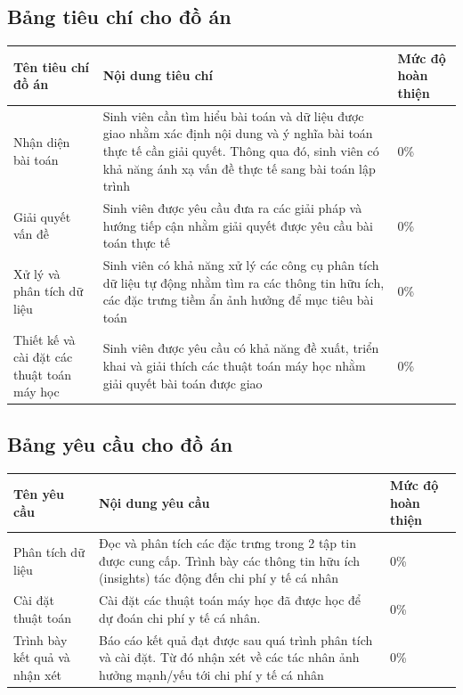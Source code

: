 \documentclass{article}
\newcommand\T{\rule{0pt}{2.6ex}}       %
\newcommand\B{\rule[-1.2ex]{0pt}{0pt}} %
\begin{document}
	\subsection{Bảng tiêu chí cho đồ án}
	\begin{center}
		\begin{tabular}{ | p{5cm} | p{6cm} | l |}\hline
			Tên tiêu chí đồ án & Nội dung tiêu chí & Mức độ hoàn thiện  \T\B\\\hline
			Nhận diện bài toán & Sinh viên cần tìm hiểu bài toán và dữ liệu được giao
			nhằm xác định nội dung và ý nghĩa bài toán thực tế cần giải quyết. Thông
			qua đó, sinh viên có khả năng ánh xạ vấn đề thực tế sang bài toán lập trình & 0\%  \T\B\\\hline
			Giải quyết vấn đề & Sinh viên được yêu cầu đưa ra các giải pháp và hướng
			tiếp cận nhằm giải quyết được yêu cầu bài toán thực tế & 0\%  \T\B\\\hline
			Xử lý và phân tích dữ liệu & Sinh viên có khả năng xử lý các công cụ phân
			tích dữ liệu tự động nhằm tìm ra các thông tin hữu ích, các đặc trưng tiềm ẩn
			ảnh hưởng để mục tiêu bài toán &0\%  \T\B\\\hline
			Thiết kế và cài đặt các thuật toán máy học & Sinh viên được yêu cầu có
			khả năng đề xuất, triển khai và giải thích các thuật toán máy học nhằm giải
			quyết bài toán được giao & 0\%  \T\B\\\hline
		\end{tabular}
	\end{center}
	\subsection{Bảng yêu cầu cho đồ án}
	\begin{center}
		\begin{tabular}{ | p{5cm} | p{6cm} | l |}\hline	
			Tên yêu cầu & Nội dung yêu cầu & Mức độ hoàn thiện  \T\B\\\hline
			Phân tích dữ liệu & Đọc và phân tích các đặc trưng trong 2 tập tin được cung cấp. Trình bày các thông tin hữu ích (insights) tác động đến chi phí y tế cá nhân & 0\%  \T\B\\\hline
			Cài đặt thuật toán & Cài đặt các thuật toán máy học đã được học để dự đoán chi phí y tế cá nhân. & 0\%  \T\B\\\hline
			Trình bày kết quả và nhận xét & Báo cáo kết quả đạt được sau quá trình phân tích và cài đặt. Từ đó nhận xét về các tác nhân ảnh hưởng mạnh/yếu tới chi phí y tế cá nhân & 0\%  \T\B\\\hline
		\end{tabular}
	\end{center}	
\end{document}
